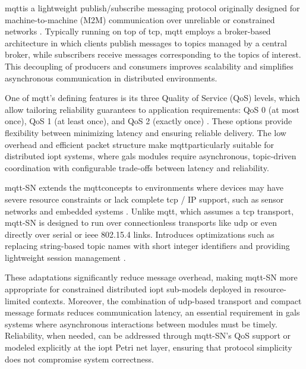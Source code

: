 \gls{mqtt}is a lightweight publish/subscribe messaging protocol originally designed for machine-to-machine (M2M) communication over unreliable or constrained networks \cite{oasis2019mqtt, banks2014mqtt}. Typically running on top of \gls{tcp}, \gls{mqtt} employs a broker-based architecture in which clients publish messages to topics managed by a central broker, while subscribers receive messages corresponding to the topics of interest. This decoupling of producers and consumers improves scalability and simplifies asynchronous communication in distributed environments.

One of \gls{mqtt}’s defining features is its three Quality of Service (QoS) levels, which allow tailoring reliability guarantees to application requirements: QoS 0 (at most once), QoS 1 (at least once), and QoS 2 (exactly once) \cite{oasis2019mqtt}. These options provide flexibility between minimizing latency and ensuring reliable delivery. The low overhead and efficient packet structure make \gls{mqtt}particularly suitable for distributed \gls{iopt} systems, where \gls{gals} modules require asynchronous, topic-driven coordination with configurable trade-offs between latency and reliability.

\gls{mqtt}-SN extends the \gls{mqtt}concepts to environments where devices may have severe resource constraints or lack complete \gls{tcp} / IP support, such as sensor networks and embedded systems \cite{singh2015mqttsn, confusion2013mqttsn}. Unlike \gls{mqtt}, which assumes a \gls{tcp} transport, \gls{mqtt}-SN is designed to run over connectionless transports like \gls{udp} or even directly over serial or \gls{ieee} 802.15.4 links. Introduces optimizations such as replacing string-based topic names with short integer identifiers and providing lightweight session management \cite{singh2015mqttsn}. 

These adaptations significantly reduce message overhead, making \gls{mqtt}-SN more appropriate for constrained distributed \gls{iopt} sub-models deployed in resource-limited contexts. Moreover, the combination of \gls{udp}-based transport and compact message formats reduces communication latency, an essential requirement in \gls{gals} systems where asynchronous interactions between modules must be timely. Reliability, when needed, can be addressed through \gls{mqtt}-SN’s QoS support or modeled explicitly at the \gls{iopt} Petri net layer, ensuring that protocol simplicity does not compromise system correctness.

